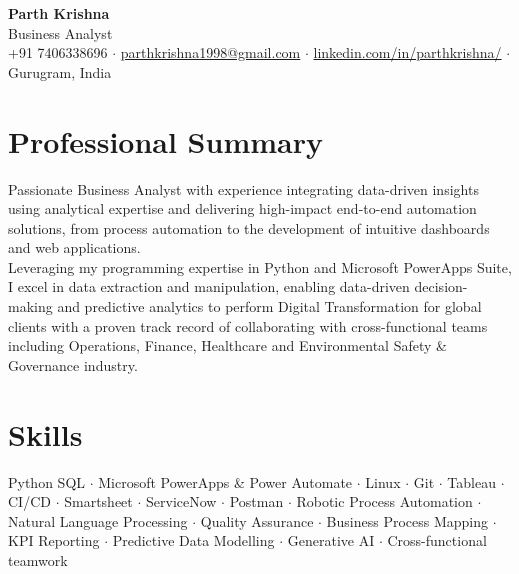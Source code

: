 \documentclass[a4paper,20pt]{article}
\begin{document}

\begin{center}
    \textbf{\LARGE Parth Krishna} \\ \vspace{1pt}
     {Business Analyst} \\
    +91 7406338696 $\cdot$ \href{mailto:parthkrishna1998@gmail.com}{parthkrishna1998@gmail.com} $\cdot$ 
    \href{https://www.linkedin.com/in/parthkrishna/}{linkedin.com/in/parthkrishna/} $\cdot$
    Gurugram, India
\end{center}


\section*{Professional Summary}
{}Passionate Business Analyst with experience integrating data-driven insights using analytical expertise and delivering high-impact end-to-end automation solutions, from process automation to the development of intuitive dashboards and web applications.
\newline
\\
Leveraging my programming expertise in Python and Microsoft PowerApps Suite, I excel in data extraction and manipulation, enabling data-driven decision-making and predictive analytics to perform Digital Transformation for global clients with a proven track record of collaborating with cross-functional teams including Operations, Finance, Healthcare and Environmental Safety \& Governance industry.

\section{Skills}
\small{
    {Python SQL $\cdot$ Microsoft PowerApps \& Power Automate $\cdot$ Linux $\cdot$ Git $\cdot$  Tableau $\cdot$ CI/CD $\cdot$ Smartsheet $\cdot$ ServiceNow $\cdot$ Postman $\cdot$ Robotic Process Automation $\cdot$ Natural Language Processing $\cdot$ Quality Assurance $\cdot$ Business Process Mapping $\cdot$ KPI Reporting $\cdot$ Predictive Data Modelling $\cdot$ Generative AI $\cdot$ Cross-functional teamwork
    }}
\end{document}

